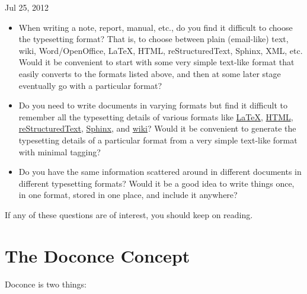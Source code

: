 \documentclass{book}
\begin{document}

\begin{center}
Jul 25, 2012
\end{center}


\begin{itemize}
 \item When writing a note, report, manual, etc., do you find it difficult
   to choose the typesetting format? That is, to choose between plain
   (email-like) text, wiki, Word/OpenOffice, {\LaTeX}, HTML,
   reStructuredText, Sphinx, XML, etc.  Would it be convenient to
   start with some very simple text-like format that easily converts
   to the formats listed above, and then at some later stage
   eventually go with a particular format?

 \item Do you need to write documents in varying formats but find it
   difficult to remember all the typesetting details of various
   formats like \href{{http://refcards.com/docs/silvermanj/amslatex/LaTeXRefCard.v2.0.pdf}}{LaTeX}, \href{{http://www.htmlcodetutorial.com/}}{HTML}, \href{{http://docutils.sourceforge.net/docs/ref/rst/restructuredtext.html}}{reStructuredText}, \href{{http://sphinx.pocoo.org/contents.html}}{Sphinx}, and \href{{http://code.google.com/p/support/wiki/WikiSyntax}}{wiki}? Would it be convenient
   to generate the typesetting details of a particular format from a
   very simple text-like format with minimal tagging?

 \item Do you have the same information scattered around in different
   documents in different typesetting formats? Would it be a good idea
   to write things once, in one format, stored in one place, and
   include it anywhere?
\end{itemize}

\noindent
If any of these questions are of interest, you should keep on reading.


\section{The Doconce Concept}

Doconce is two things:
\end{document}
